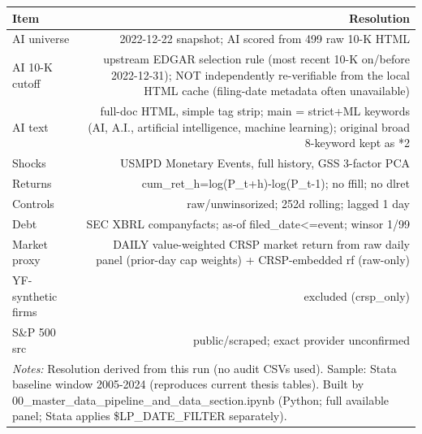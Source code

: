 \begin{tabular}{lr}
\toprule
Item & Resolution \\
\midrule
AI universe & 2022-12-22 snapshot; AI scored from 499 raw 10-K HTML \\
AI 10-K cutoff & upstream EDGAR selection rule (most recent 10-K on/before 2022-12-31); NOT independently re-verifiable from the local HTML cache (filing-date metadata often unavailable) \\
AI text & full-doc HTML, simple tag strip; main = strict+ML keywords (AI, A.I., artificial intelligence, machine learning); original broad 8-keyword kept as *2 \\
Shocks & USMPD Monetary Events, full history, GSS 3-factor PCA \\
Returns & cum\_ret\_h=log(P\_{t+h})-log(P\_{t-1}); no ffill; no dlret \\
Controls & raw/unwinsorized; 252d rolling; lagged 1 day \\
Debt & SEC XBRL companyfacts; as-of filed\_date<=event; winsor 1/99 \\
Market proxy & DAILY value-weighted CRSP market return from raw daily panel (prior-day cap weights) + CRSP-embedded rf (raw-only) \\
YF-synthetic firms & excluded (crsp\_only) \\
S\&P 500 src & public/scraped; exact provider unconfirmed \\
\bottomrule
\multicolumn{2}{p{0.95\linewidth}}{\footnotesize \textit{Notes:} Resolution derived from this run (no audit CSVs used). Sample: Stata baseline window 2005-2024 (reproduces current thesis tables). Built by 00\_master\_data\_pipeline\_and\_data\_section.ipynb (Python; full available panel; Stata applies \$LP\_DATE\_FILTER separately).} \\
\end{tabular}
